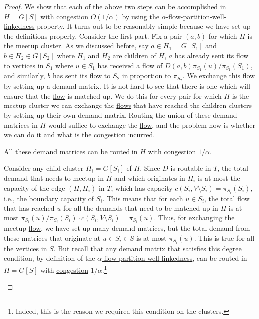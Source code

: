 \begin{proof}
	We show that each of the above two steps can be accomplished in \(H = G[S]\) with \hyperref[def:congestion]{congestion} \(O(1 / \alpha )\) by using the \hyperref[def:partition-and-boundary-well-linked]{\(\alpha \)-flow-partition-well-linkedness} property. It turns out to be reasonably simple because we have set up the definitions properly. Consider the first part. Fix a pair \((a, b)\) for which \(H\) is the meetup cluster. As we discussed before, say \(a \in H_1 = G[S_1]\) and \(b \in H_2 \in G[S_2]\) where \(H_1\) and \(H_2\) are children of \(H\), \(a\) has already sent its \hyperref[def:flow]{flow} to vertices in \(S_1\) where \(u \in S_1\) has received a \hyperref[def:flow]{flow} of \(D(a, b) \pi _{S_1}(u) / \pi _{S_1}(S_1)\), and similarly, \(b\) has sent its \hyperref[def:flow]{flow} to \(S_2\) in proportion to \(\pi _{S_2}\). We exchange this \hyperref[def:flow]{flow} by setting up a demand matrix. It is not hard to see that there is one which will ensure that the \hyperref[def:flow]{flow} is matched up. We do this for every pair for which \(H\) is the meetup cluster we can exchange the \hyperref[def:flow]{flows} that have reached the children clusters by setting up their own demand matrix. Routing the union of these demand matrices in \(H\) would suffice to exchange the \hyperref[def:flow]{flow}, and the problem now is whether we can do it and what is the \hyperref[def:congestion]{congestion} incurred.
	\begin{claim}
		All these demand matrices can be routed in \(H\) with \hyperref[def:congestion]{congestion} \(1 / \alpha \).
	\end{claim}
	\begin{explanation}
		Consider any child cluster \(H_i = G[S_i]\) of \(H\). Since \(D\) is routable in \(T\), the total demand that needs to meetup in \(H\) and which originates in \(H_i\) is at most the capacity of the edge \((H, H_i)\) in \(T\), which has capacity \(c(S_i, V\setminus S_i) = \pi _{S_i}(S_i)\), i.e., the boundary capacity of \(S_i\). This means that for each \(u \in S_i\), the total \hyperref[def:flow]{flow} that has reached \(u\) for all the demands that need to be matched up in \(H\) is at most \(\pi _{S_i}(u) / \pi _{S_i}(S_i) \cdot c(S_i, V\setminus S_i) = \pi _{S_i}(u)\). Thus, for exchanging the meetup \hyperref[def:flow]{flow}, we have set up many demand matrices, but the total demand from these matrices that originate at \(u \in S_i \in S\) is at most \(\pi _{S_i}(u)\). This is true for all the vertices in \(S\). But recall that any demand matrix that satisfies this degree condition, by definition of the \hyperref[def:partition-and-boundary-well-linked]{\(\alpha \)-flow-partition-well-linkedness}, can be routed in \(H = G[S]\) with \hyperref[def:congestion]{congestion} \(1 / \alpha \).\footnote{Indeed, this is the reason we required this condition on the clusters.}

\end{explanation}
\end{proof}
